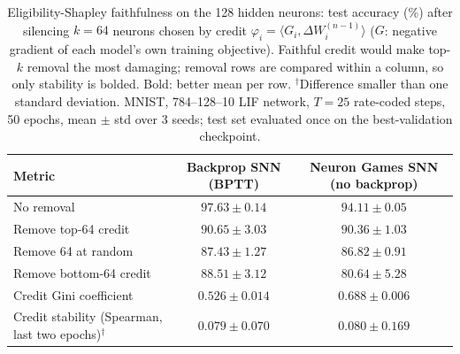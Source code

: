 \begin{table}[t]
\centering
\small
\caption{Eligibility-Shapley faithfulness on the 128 hidden neurons: test accuracy (\%) after silencing $k=64$ neurons chosen by credit $\varphi_i = \langle G_i, \Delta W_i^{(n-1)} \rangle$ ($G$: negative gradient of each model's own training objective). Faithful credit would make top-$k$ removal the most damaging; removal rows are compared within a column, so only stability is bolded. Bold: better mean per row. $^\dagger$Difference smaller than one standard deviation. MNIST, 784--128--10 LIF network, $T=25$ rate-coded steps, 50 epochs, mean $\pm$ std over 3 seeds; test set evaluated once on the best-validation checkpoint.}
\label{tab:ng-explain}
\begin{tabular}{lcc}
\toprule
Metric & Backprop SNN (BPTT) & Neuron Games SNN (no backprop) \\
\midrule
No removal & $97.63 \pm 0.14$ & $94.11 \pm 0.05$ \\
Remove top-64 credit & $90.65 \pm 3.03$ & $90.36 \pm 1.03$ \\
Remove 64 at random & $87.43 \pm 1.27$ & $86.82 \pm 0.91$ \\
Remove bottom-64 credit & $88.51 \pm 3.12$ & $80.64 \pm 5.28$ \\
\midrule
Credit Gini coefficient & $0.526 \pm 0.014$ & $0.688 \pm 0.006$ \\
Credit stability (Spearman, last two epochs)$^\dagger$ & $0.079 \pm 0.070$ & $\boldsymbol{0.080 \pm 0.169}$ \\
\bottomrule
\end{tabular}
\end{table}
